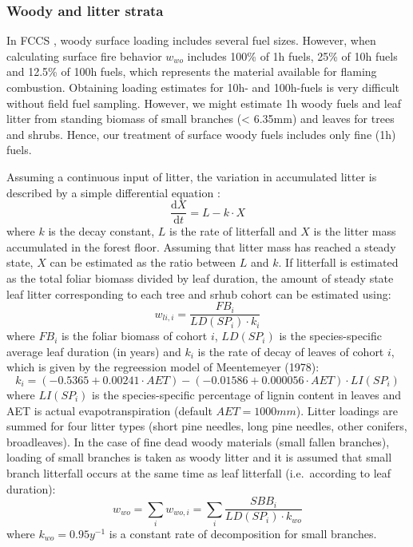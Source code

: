\documentclass[]{book}
\begin{document}
\hypertarget{woody-and-litter-strata}{%
\subsubsection{Woody and litter strata}\label{woody-and-litter-strata}}

In FCCS \citep{Prichard2013}, woody surface loading includes several fuel sizes. However, when calculating surface fire behavior \(w_{wo}\) includes 100\% of 1h fuels, 25\% of 10h fuels and 12.5\% of 100h fuels, which represents the material available for flaming combustion. Obtaining loading estimates for 10h- and 100h-fuels is very difficult without field fuel sampling. However, we might estimate 1h woody fuels and leaf litter from standing biomass of small branches (\textless{} 6.35mm) and leaves for trees and shrubs. Hence, our treatment of surface woody fuels includes only fine (1h) fuels.

Assuming a continuous input of litter, the variation in accumulated litter is described by a simple differential equation \citep{Birk1980}:
\begin{equation}
\frac{\mathrm{d}X}{\mathrm{d}t} = L - k\cdot X
\end{equation}
where \(k\) is the decay constant, \(L\) is the rate of litterfall and \(X\) is the litter mass accumulated in the forest floor. Assuming that litter mass has reached a steady state, \(X\) can be estimated as the ratio between \(L\) and \(k\). If litterfall is estimated as the total foliar biomass divided by leaf duration, the amount of steady state leaf litter corresponding to each tree and srhub cohort can be estimated using:
\begin{equation}
w_{li, i} = \frac{FB_i}{LD(SP_i) \cdot k_i}
\end{equation}
where \(FB_i\) is the foliar biomass of cohort \(i\), \(LD(SP_i)\) is the species-specific average leaf duration (in years) and \(k_i\) is the rate of decay of leaves of cohort \(i\), which is given by the regreession model of Meentemeyer (1978):
\begin{equation}
k_i = (-0.5365+0.00241\cdot AET) - (-0.01586+0.000056\cdot AET) \cdot LI(SP_i) 
\end{equation}
where \(LI(SP_i)\) is the species-specific percentage of lignin content in leaves and AET is actual evapotranspiration (default \(AET = 1000 mm\)). Litter loadings are summed for four litter types (short pine needles, long pine needles, other conifers, broadleaves). In the case of fine dead woody materials (small fallen branches), loading of small branches is taken as woody litter and it is assumed that small branch litterfall occurs at the same time as leaf litterfall (i.e.~according to leaf duration):
\begin{equation}
w_{wo} = \sum_{i}{w_{wo, i}} = \sum_{i}{\frac{SBB_i}{LD(SP_i)\cdot k_{wo}} }
\end{equation}
where \(k_{wo} = 0.95 y^{-1}\) is a constant rate of decomposition for small branches.
\end{document}
